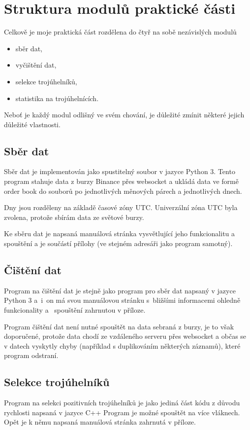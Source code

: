 \documentclass[thesis=B,czech]{FITthesis}[2019/03/21]
\begin{document}
\section{Struktura modulů praktické části}
Celkově je moje praktická část rozdělena do čtyř na sobě nezávislých modulů
\begin{itemize}
    \item sběr dat,
    \item vyčištění dat,
    \item selekce trojúhelníků,
    \item statistika na trojúhelnících.
\end{itemize}

Neboť je každý modul odlišný ve svém chování, je důležité zmínit některé jejich důležité vlastnosti.

\subsection{Sběr dat}
Sběr dat je implementován jako spustitelný soubor v jazyce Python 3. Tento program stahuje data z burzy Binance přes websocket a ukládá data ve formě order book do souborů po jednotlivých měnových párech a jednotlivých dnech.

Dny jsou rozděleny na základě časové zóny UTC. Univerzální zóna UTC byla zvolena, protože sbírám data ze světové burzy. 

Ke sběru dat je napsaná manuálová stránka vysvětlující jeho funkcionalitu a spouštění a je součástí přílohy (ve stejném adresáři jako program samotný).

\subsection{Čištění dat}
\label{subsection:cleanup}
Program na čištění dat je stejně jako program pro sběr dat napsaný v jazyce Python 3 a~i~on má svou manuálovou stránku s~bližšími informacemi ohledně funkcionality a~ spouštění zahrnutou v příloze. 

Program čištění dat není nutné spouštět na data sebraná z burzy, je to však doporučené, protože data chodí ze vzdáleného serveru přes websocket a občas se v datech vyskytly chyby (například s duplikováním některých záznamů), které program odstraní.

\subsection{Selekce trojúhelníků}
Program na selekci pozitivních trojúhelníků je jako jediná část kódu z důvodu rychlosti napsaná v jazyce C++ Program je možné spouštět na více vláknech. Opět je k němu napsaná manuálová stránka zahrnutá v příloze. 
\end{document}
